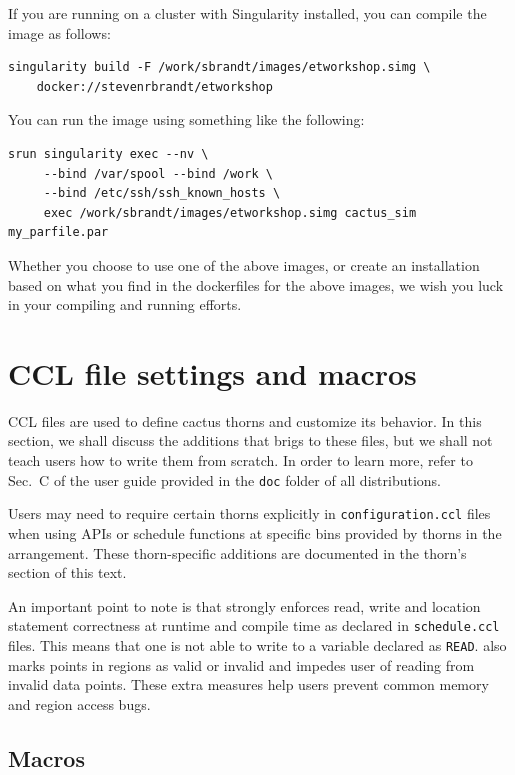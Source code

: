 If you are running on a cluster with Singularity installed, you can compile the image as follows:

\begin{verbatim}
singularity build -F /work/sbrandt/images/etworkshop.simg \
    docker://stevenrbrandt/etworkshop
\end{verbatim}

You can run the image using something like the following:
\begin{verbatim}
srun singularity exec --nv \
     --bind /var/spool --bind /work \
     --bind /etc/ssh/ssh_known_hosts \
     exec /work/sbrandt/images/etworkshop.simg cactus_sim my_parfile.par
\end{verbatim}

Whether you choose to use one of the above images, or create an installation based on what you find in the dockerfiles for the above images, we wish you luck in your compiling and running efforts.

\section{CCL file settings and macros}
\label{sec:ccl_files}
CCL files are used to define cactus thorns and customize its behavior. In this section, we shall discuss the additions that \CarpetX\space brigs to these files, but we shall not teach users how to write them from scratch. In order to learn more, refer to Sec.~C of the \Cactus\space user guide provided in the \texttt{doc} folder of all distributions.

Users may need to require certain thorns explicitly in \texttt{configuration.ccl} files when using \CarpetX\space APIs or schedule functions at specific bins provided by thorns in the \CarpetX\space arrangement. These thorn-specific additions are documented in the thorn's section of this text.

An important point to note is that \CarpetX\space strongly enforces read, write and location statement correctness at runtime and compile time as declared in \texttt{schedule.ccl} files. This means that one is not able to write to a variable declared as \texttt{READ}. \CarpetX\space also marks points in regions as valid or invalid and impedes user of reading from invalid data points. These extra measures help users prevent common memory and region access bugs. 

\subsection{Macros}

